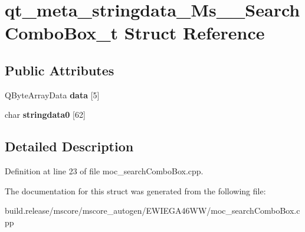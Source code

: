 \hypertarget{structqt__meta__stringdata___ms_____search_combo_box__t}{}\section{qt\+\_\+meta\+\_\+stringdata\+\_\+\+Ms\+\_\+\+\_\+\+Search\+Combo\+Box\+\_\+t Struct Reference}
\label{structqt__meta__stringdata___ms_____search_combo_box__t}
\subsection*{Public Attributes}
\begin{DoxyCompactItemize}
\item 
\mbox{\label{structqt__meta__stringdata___ms_____search_combo_box__t_a89ac4c85180a84598dfbf7542c15b652}} 
Q\+Byte\+Array\+Data {\bfseries data} \mbox{[}5\mbox{]}
\item 
\mbox{\label{structqt__meta__stringdata___ms_____search_combo_box__t_a62d7257a056d61328bd1199b081af653}} 
char {\bfseries stringdata0} \mbox{[}62\mbox{]}
\end{DoxyCompactItemize}


\subsection{Detailed Description}


Definition at line 23 of file moc\+\_\+search\+Combo\+Box.\+cpp.



The documentation for this struct was generated from the following file\+:\begin{DoxyCompactItemize}
\item 
build.\+release/mscore/mscore\+\_\+autogen/\+E\+W\+I\+E\+G\+A46\+W\+W/moc\+\_\+search\+Combo\+Box.\+cpp\end{DoxyCompactItemize}
